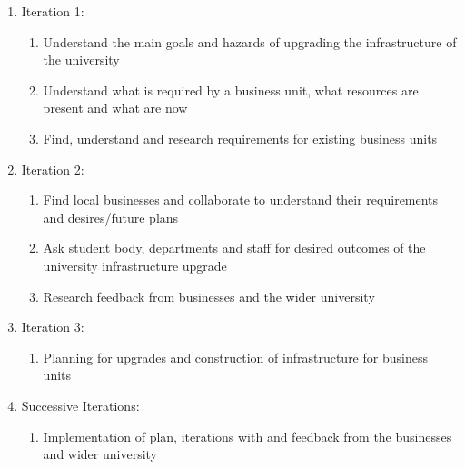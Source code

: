 \documentclass[10pt]{article}
\begin{document}
        \begin{enumerate}
            \item Iteration 1:
                \begin{enumerate}
                    \item Understand the main goals and hazards of upgrading the infrastructure of the university
                    \item Understand what is required by a business unit, what resources are present and what are now
                    \item Find, understand and research requirements for existing business units
                \end{enumerate}
            \item Iteration 2:
                \begin{enumerate}
                    \item Find local businesses and collaborate to understand their requirements and desires/future plans
                    \item Ask student body, departments and staff for desired outcomes of the university infrastructure upgrade
                    \item Research feedback from businesses and the wider university
                \end{enumerate}
            \item Iteration 3:
                \begin{enumerate}
                    \item Planning for upgrades and construction of infrastructure for business units
                \end{enumerate}
            \item Successive Iterations:
                \begin{enumerate}
                    \item Implementation of plan, iterations with and feedback from the businesses and wider university
                \end{enumerate}
        \end{enumerate}
\end{document}
